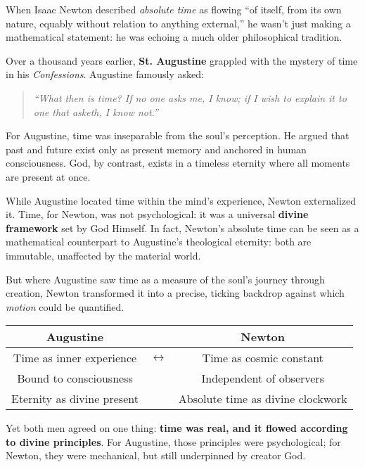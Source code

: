   \begin{tcolorbox}[colback=gray!5!white, colframe=black, title=\textbf{Historical Sidebar: Newton and Augustine — Time Between Eternity and Motion}, fonttitle=\bfseries, arc=1.5mm, boxrule=0.4pt]

    When Isaac Newton described \textit{absolute time} as flowing “of itself, from its own nature, equably without relation to anything external,” he wasn’t just making a mathematical statement: he was echoing a much older philosophical tradition.

    \medskip
    
    Over a thousand years earlier, \textbf{St. Augustine} grappled with the mystery of time in his \textit{Confessions}. Augustine famously asked:
    
    \begin{quote} \textit{“What then is time? If no one asks me, I know; if I wish to explain it to one that asketh, I know not.”} \end{quote}
    
    For Augustine, time was inseparable from the soul’s perception. He argued that past and future exist only as present memory and anchored in human consciousness. God, by contrast, exists in a timeless eternity where all moments are present at once.

    \medskip
    
    While Augustine located time within the mind’s experience, Newton externalized it. Time, for Newton, was not psychological: it was a universal \textbf{divine framework} set by God Himself. In fact, Newton’s absolute time can be seen as a mathematical counterpart to Augustine’s theological eternity: both are immutable, unaffected by the material world.

    \medskip
    
    But where Augustine saw time as a measure of the soul’s journey through creation, Newton transformed it into a precise, ticking backdrop against which \textit{motion} could be quantified.

    \medskip
    
    \begin{center}
      \begin{tabular}{c c c}
      \textbf{Augustine} &  & \textbf{Newton} \\
      \hline
      Time as inner experience & $\longleftrightarrow$ & Time as cosmic constant \\
      Bound to consciousness   &                      & Independent of observers \\
      Eternity as divine present &                    & Absolute time as divine clockwork \\
      \end{tabular}
      \end{center}
    
    \medskip

    Yet both men agreed on one thing: \textbf{time was real, and it flowed according to divine principles}. For Augustine, those principles were psychological; for Newton, they were mechanical, but still underpinned by creator God.
    
    \end{tcolorbox}
  

